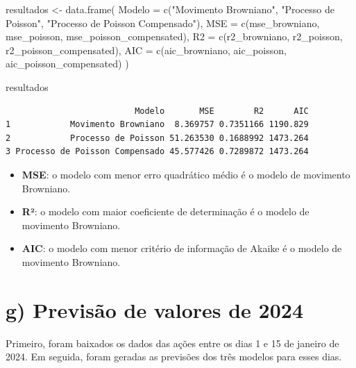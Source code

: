\documentclass[
  letterpaper,
  DIV=11,
  numbers=noendperiod]{scrreprt}
\newenvironment{Shaded}{\begin{snugshade}}{\end{snugshade}}
\newcommand{\AttributeTok}[1]{\textcolor[rgb]{0.40,0.45,0.13}{#1}}
\newcommand{\FunctionTok}[1]{\textcolor[rgb]{0.28,0.35,0.67}{#1}}
\newcommand{\NormalTok}[1]{\textcolor[rgb]{0.00,0.23,0.31}{#1}}
\newcommand{\OtherTok}[1]{\textcolor[rgb]{0.00,0.23,0.31}{#1}}
\newcommand{\StringTok}[1]{\textcolor[rgb]{0.13,0.47,0.30}{#1}}
\providecommand{\tightlist}{%
  \setlength{\itemsep}{0pt}\setlength{\parskip}{0pt}}\usepackage{longtable,booktabs,array}
\begin{document}
\begin{Shaded}
\begin{Highlighting}[]
\NormalTok{resultados }\OtherTok{\textless{}{-}} \FunctionTok{data.frame}\NormalTok{(}
    \AttributeTok{Modelo =} \FunctionTok{c}\NormalTok{(}\StringTok{"Movimento Browniano"}\NormalTok{, }\StringTok{"Processo de Poisson"}\NormalTok{, }\StringTok{"Processo de Poisson Compensado"}\NormalTok{),}
    \AttributeTok{MSE =} \FunctionTok{c}\NormalTok{(mse\_browniano, mse\_poisson, mse\_poisson\_compensated),}
    \AttributeTok{R2 =} \FunctionTok{c}\NormalTok{(r2\_browniano, r2\_poisson, r2\_poisson\_compensated),}
    \AttributeTok{AIC =} \FunctionTok{c}\NormalTok{(aic\_browniano, aic\_poisson, aic\_poisson\_compensated)}
\NormalTok{)}

\NormalTok{resultados}
\end{Highlighting}
\end{Shaded}

\begin{verbatim}
                          Modelo       MSE        R2      AIC
1            Movimento Browniano  8.369757 0.7351166 1190.829
2            Processo de Poisson 51.263530 0.1688992 1473.264
3 Processo de Poisson Compensado 45.577426 0.7289872 1473.264
\end{verbatim}

\begin{itemize}
\tightlist
\item
  \textbf{MSE}: o modelo com menor erro quadrático médio é o modelo de
  movimento Browniano.
\item
  \textbf{R²}: o modelo com maior coeficiente de determinação é o modelo
  de movimento Browniano.
\item
  \textbf{AIC}: o modelo com menor critério de informação de Akaike é o
  modelo de movimento Browniano.
\end{itemize}

\hypertarget{g-previsuxe3o-de-valores-de-2024}{%
\section*{g) Previsão de valores de
2024}\label{g-previsuxe3o-de-valores-de-2024}}


Primeiro, foram baixados os dados das ações entre os dias 1 e 15 de
janeiro de 2024. Em seguida, foram geradas as previsões dos três modelos
para esses dias.
\end{document}
